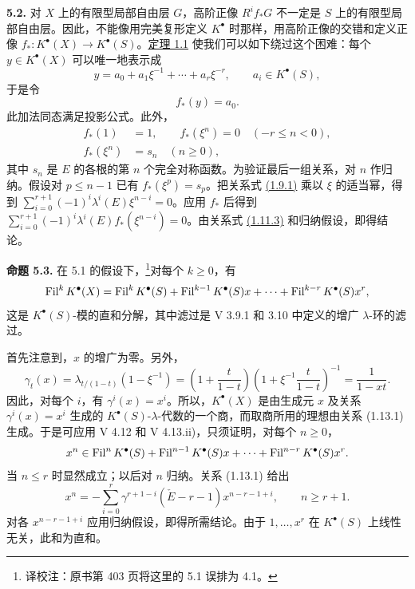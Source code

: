 \noindent\textbf{5.2.}
对 \(X\) 上的有限型局部自由层 \(G\)，高阶正像 \(R^if_*G\) 不一定是 \(S\) 上的有限型局部自由层。因此，不能像用完美复形定义 \(K^\bullet\) 时那样，用高阶正像的交错和定义正像 \(f_*:K^\bullet(X)\to K^\bullet(S)\)。\hyperlink{sga6.e06.thm.1-1}{定理 1.1} 使我们可以如下绕过这个困难：每个 \(y\in K^\bullet(X)\) 可以唯一地表示成
\begin{equation}\tag{5.2.1}
   y=a_0+a_1\xi^{-1}+\cdots+a_r\xi^{-r},
  \qquad a_i\in K^\bullet(S),
\end{equation}
于是令
\begin{equation}\tag{5.2.2}
  f_*(y)=a_0.
\end{equation}
此加法同态满足投影公式。此外，
\begin{equation}\tag{5.2.3}
\begin{aligned}
  f_*(1)&=1,\qquad f_*(\xi^n)=0\quad(-r\leq n<0),\\
  f_*(\xi^n)&=s_n\quad(n\geq0),
\end{aligned}
\end{equation}
其中 \(s_n\) 是 \(E\) 的各根的第 \(n\) 个完全对称函数。为验证最后一组关系，对 \(n\) 作归纳。假设对 \(p\leq n-1\) 已有 \(f_*(\xi^p)=s_p\)。把关系式 \hyperlink{sga6.e06.eq.1-9-1}{(1.9.1)} 乘以 \(\xi\) 的适当幂，得到 \(\sum_{i=0}^{r+1}(-1)^i\lambda^i(E)\xi^{n-i}=0\)。应用 \(f_*\) 后得到 \(\sum_{i=0}^{r+1}(-1)^i\lambda^i(E)f_*(\xi^{n-i})=0\)。由关系式 \hyperlink{sga6.e06.eq.1-11-3}{(1.11.3)} 和归纳假设，即得结论。

\textbf{命题 5.3.} 在 5.1 的假设下，\footnote{译校注：原书第 403 页将这里的 5.1 误排为 4.1。}对每个 \(k\geq 0\)，有
\[
  \operatorname{Fil}^k K^\bullet(X)
  =
  \operatorname{Fil}^k K^\bullet(S)
  +\operatorname{Fil}^{k-1}K^\bullet(S)x+\cdots+\operatorname{Fil}^{k-r}K^\bullet(S)x^r,
\]
这是 \(K^\bullet(S)\)-模的直和分解，其中滤过是 V 3.9.1 和 3.10 中定义的增广 \(\lambda\)-环的滤过。

首先注意到，\(x\) 的增广为零。另外，
\[
 \gamma_t(x)=\lambda_{t/(1-t)}(1-\xi^{-1})
 =\left(1+\frac{t}{1-t}\right)
  \left(1+\xi^{-1}\frac{t}{1-t}\right)^{-1}
 =\frac1{1-xt}.
\]
因此，对每个 \(i\)，有 \(\gamma^i(x)=x^i\)。所以，\(K^\bullet(X)\) 是由生成元 \(x\) 及关系 \(\gamma^i(x)=x^i\) 生成的 \(K^\bullet(S)\)-\(\lambda\)-代数的一个商，而取商所用的理想由关系 (1.13.1) 生成。于是可应用 V 4.12 和 V 4.13.ii)，只须证明，对每个 \(n\geq0\)，
\[
 x^n\in\operatorname{Fil}^nK^\bullet(S)+\operatorname{Fil}^{n-1}K^\bullet(S)x
       +\cdots+\operatorname{Fil}^{n-r}K^\bullet(S)x^r.
\]
当 \(n\leq r\) 时显然成立；以后对 \(n\) 归纳。关系 (1.13.1) 给出
\[
 x^n=-\sum_{i=0}^r\gamma^{r+1-i}(\check E-r-1)x^{n-r-1+i},
 \qquad n\geq r+1.
\]
对各 \(x^{n-r-1+i}\) 应用归纳假设，即得所需结论。由于 \(1,\ldots,x^r\) 在 \(K^\bullet(S)\) 上线性无关，此和为直和。

